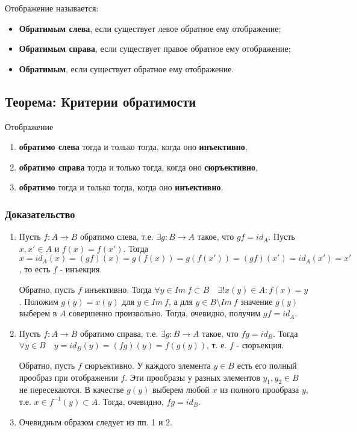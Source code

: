 \documentclass{article}
\begin{document}
Отображение называется:
\begin{itemize}
\item \textbf{Обратимым слева}, если существует левое обратное ему отображение;
\item \textbf{Обратимым справа}, если существует правое обратное ему отображение;
\item \textbf{Обратимым}, если существует обратное ему отображение.
\end{itemize}

\subsection{Теорема: Критерии обратимости}
Отображение
\begin{enumerate}
\item \textbf{обратимо слева} тогда и только тогда, когда оно \textbf{инъективно},
\item \textbf{обратимо справа} тогда и только тогда, когда оно \textbf{сюръективно},
\item \textbf{обратимо} тогда и только тогда, когда оно \textbf{инъективно}.
\end{enumerate}

\subsubsection*{Доказательство}
\begin{enumerate}
\item Пусть $f: A \rightarrow B$ обратимо слева, т.е. $\exists g : B \rightarrow A$ такое, что $gf = id_A$. Пусть $x, x' \in A$ и $f(x) = f(x')$. Тогда $x = id_A(x) = (gf)(x) = g(f(x)) = g(f(x')) = (gf)(x') = id_A(x') = x'$, то есть $f$ - инъекция.

Обратно, пусть $f$ инъективно. Тогда $\forall y \in Im~f \subset B \quad \exists ! x(y) \in A : f(x) = y$. Положим $g(y) = x(y)$ для $y \in Im~f$, а для $y \in B \setminus Im~f$ значение $g(y)$ выберем в $A$ совершенно произвольно. Тогда, очевидно, получим $gf = id_A$.

\item Пусть $f : A \rightarrow B$ обратимо справа, т.е. $\exists g : B \rightarrow A$ такое, что $fg = id_B$. Тогда $\forall y \in B \quad y = id_B(y) = (fg)(y) = f(g(y))$, т. е. $f$ - сюръекция.

Обратно, пусть $f$ сюръективно. У каждого элемента $y \in B$ есть его полный прообраз при отображении $f$. Эти прообразы у разных элементов $y_1, y_2 \in B$ не пересекаются. В качестве $g(y)$ выберем любой $x$ из полного прообраза $y$, т.е. $x \in f^{-1}(y) \subset A$. Тогда, очевидно, $fg = id_B$.

\item Очевидным образом следует из пп. 1 и 2.
\end{enumerate}
\end{document}
